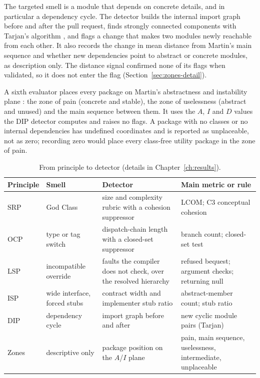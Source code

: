 \begin{description}[leftmargin=1.4cm,style=nextline]
\item[DIP (Dependency Inversion).] The targeted smell is a module that depends on concrete details,
and in particular a dependency cycle. The detector builds the internal import graph before and
after the pull request, finds strongly connected components with Tarjan's algorithm
\citep{tarjan1972scc}, and flags a change that makes two modules newly reachable from each other. It
also records the change in mean distance from Martin's main sequence and whether new dependencies
point to abstract or concrete modules, as description only. The distance signal confirmed none of
its flags when validated, so it does not enter the flag (Section~\ref{sec:zones-detail}).

\item[Component zones (descriptive only).] A sixth evaluator places every package on Martin's
abstractness and instability plane \citep{martin2003agile}: the zone of pain (concrete and
stable), the zone of uselessness (abstract and unused) and the main sequence between them. It uses
the $A$, $I$ and $D$ values the DIP detector computes and raises no flags. A package with no classes
or no internal dependencies has undefined coordinates and is reported as unplaceable, not as zero;
recording zero would place every class-free utility package in the zone of pain.
\end{description}

\begin{table}[htb]
\centering
\caption{From principle to detector (details in Chapter~\ref{ch:results}).}
\label{tab:proxy-map}
\small
\begin{tabular}{@{}L{1.75cm}L{2.6cm}L{4.1cm}L{4.35cm}@{}}
\toprule
\textbf{Principle} & \textbf{Smell} & \textbf{Detector} & \textbf{Main metric or rule} \\
\midrule
SRP & God Class & size and complexity rubric with a cohesion suppressor & LCOM; C3 conceptual cohesion \\
OCP & type or tag switch & dispatch-chain length with a closed-set suppressor & branch count;
closed-set test \\
LSP & incompatible override & faults the compiler does not check, over the resolved hierarchy &
refused bequest; argument checks; returning null \\
ISP & wide interface, forced stubs & contract width and implementer stub ratio & abstract-member
count; stub ratio \\
DIP & dependency cycle & import graph before and after & new cyclic module pairs (Tarjan) \\
Zones & descriptive only & package position on the $A$/$I$ plane & pain, main sequence,
uselessness, intermediate, unplaceable \\
\bottomrule
\end{tabular}
\end{table}

